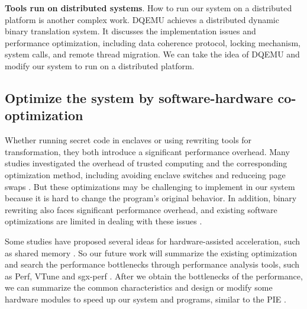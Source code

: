 \textbf{Tools run on distributed systems}.
How to run our system on a distributed platform is another complex work.
DQEMU \cite{Zhao2020DQEMUAS} achieves a distributed dynamic binary translation system.
It discusses the implementation issues and performance optimization, including
data coherence protocol, locking mechanism, system calls, and remote thread migration.
We can take the idea of DQEMU and modify our system to run on a distributed platform.

\subsection{Optimize the system by software-hardware co-optimization}
\label{sec:ToolWithOptimization}
Whether running secret code in enclaves or using rewriting tools for transformation,
they both introduce a significant performance overhead.
Many studies investigated the overhead of trusted computing and
the corresponding optimization method, including avoiding enclave switches
\cite{Tian2018SwitchlessCM} and reduceing page swaps \cite{Orenbach2017EleosEO, Taassori2018VAULTRP}.
But these optimizations may be challenging to implement in our system because it is hard
to change the program's original behavior.
In addition, binary rewriting also faces significant performance overhead, and existing
software optimizations are limited in dealing with these issues \cite{Kim2003HardwareSF}.

Some studies have proposed several ideas for hardware-assisted acceleration, such as
shared memory \cite{Jiang2022CRONUSFS}.
So our future work will summarize the existing optimization and search the performance
bottlenecks through performance analysis tools, such as Perf, VTune and sgx-perf \cite{Weichbrodt2018sgxperfAP}.
After we obtain the bottlenecks of the performance, we can summarize the common characteristics
and design or modify some hardware modules to speed up our system and programs, similar to
the PIE \cite{Schneider2021PIEAP}.